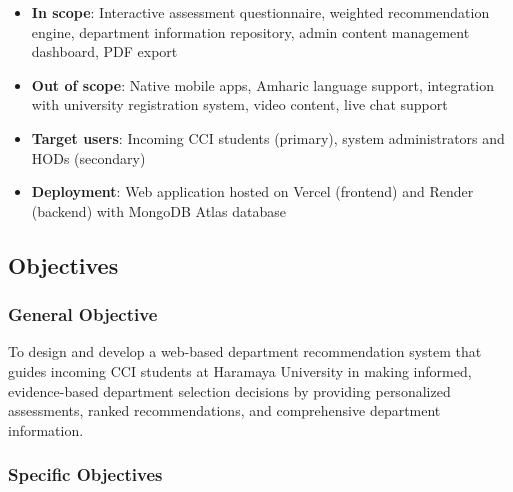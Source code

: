 ﻿\documentclass[12pt, a4paper]{article}
\begin{document}
\begin{itemize}[leftmargin=1.5em, itemsep=3pt]
    \item \textbf{In scope}: Interactive assessment questionnaire, weighted recommendation engine, department information repository, admin content management dashboard, PDF export
    \item \textbf{Out of scope}: Native mobile apps, Amharic language support, integration with university registration system, video content, live chat support
    \item \textbf{Target users}: Incoming CCI students (primary), system administrators and HODs (secondary)
    \item \textbf{Deployment}: Web application hosted on Vercel (frontend) and Render (backend) with MongoDB Atlas database
\end{itemize}

\subsection{Objectives}

\subsubsection*{General Objective}

To design and develop a web-based department recommendation system that guides incoming CCI students at Haramaya University in making informed, evidence-based department selection decisions by providing personalized assessments, ranked recommendations, and comprehensive department information.

\subsubsection*{Specific Objectives}
\end{document}
